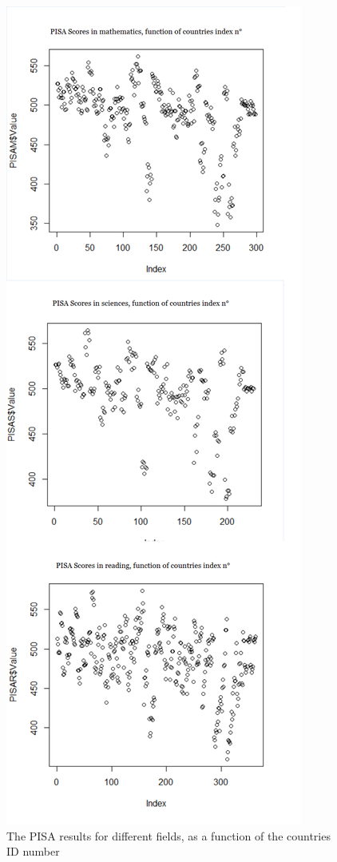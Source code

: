 \documentclass[12pt,a4paper]{article}
\begin{document}
\begin{figure}
	\centering
	\caption{The PISA results for different fields, as a function of the countries ID number}
	\includegraphics[scale=0.4]{img/IntraDependencePISA.png}
\end{figure}
\end{document}
